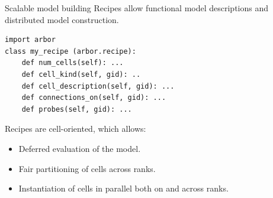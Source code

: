 \documentclass[aspectratio=43]{beamer}
\newcommand{\arbor}{{\ttfamily Arbor}\xspace}
\begin{document}


\begin{frame}[fragile]{Scalable model building}
    Recipes allow functional model descriptions and distributed model construction.  
    \begin{lstlisting}[style=talkpython]
import arbor
class my_recipe (arbor.recipe):
    def num_cells(self): ...
    def cell_kind(self, gid): ..
    def cell_description(self, gid): ...
    def connections_on(self, gid): ...
    def probes(self, gid): ...
    \end{lstlisting}

    \vspace{10pt}

    Recipes are cell-oriented, which allows: 
    \begin{itemize}
        \item Deferred evaluation of the model.
        \item Fair partitioning of cells across ranks.
        \item Instantiation of cells in parallel both on and across ranks.
    \end{itemize}
\end{frame}
\end{document}

